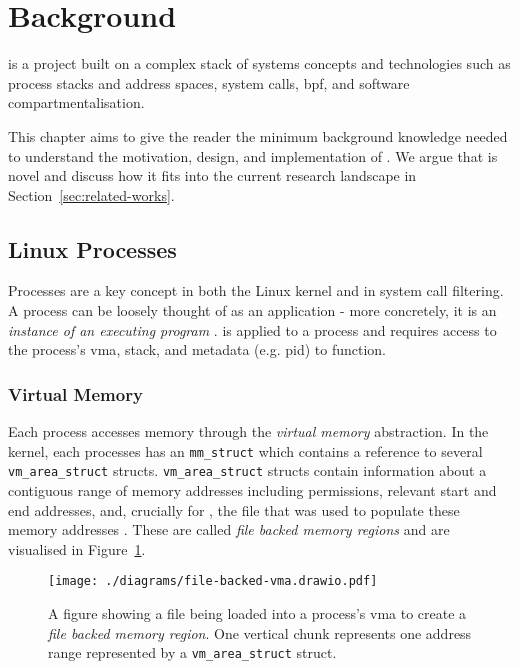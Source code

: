 \section{Background} \label{sec:background}

\af is a project built on a complex stack of systems concepts and technologies
such as process stacks and address spaces, system calls, \ac{bpf}, and software
compartmentalisation. 

This chapter aims to give the reader the minimum background knowledge needed
to understand the motivation, design, and implementation of \af. We argue that
\af is novel and discuss how it  fits into the current research landscape in
Section~\ref{sec:related-works}.

\subsection{Linux Processes}

Processes are a key concept in both the Linux kernel and in system call
filtering. A process can be loosely thought of as an application - more 
concretely, it is an \textit{instance of an executing program} 
\cite{LINUX_PROGRAMMING_INTERFACE}. \af is applied to a process and requires 
access to the process's \ac{vma}, stack, and metadata (e.g. \ac{pid}) to 
function.

\subsubsection{Virtual Memory}

Each process accesses memory through the \textit{virtual memory} abstraction.
In the kernel, each processes has an \texttt{mm\_struct} which contains a
reference to several \texttt{vm\_area\_struct} structs. 
\texttt{vm\_area\_struct} structs contain information about a contiguous
range of memory addresses including permissions, relevant start and end
addresses, and, crucially for \af, the file that was used to populate these
memory addresses \cite{love2005linux}. These are called \textit{file backed
memory regions} and are visualised in Figure~\ref{fig:file-backed-vma}.

\begin{figure}[ht]
    \centering
    \texttt{[image: ./diagrams/file-backed-vma.drawio.pdf]} 
    \caption{A figure showing a file being loaded into a process's \ac{vma} to
    create a \textit{file backed memory region}. One vertical chunk represents
one address range represented by a \texttt{vm\_area\_struct} struct.}
    \label{fig:file-backed-vma}
\end{figure}

